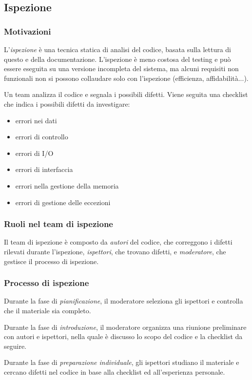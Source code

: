 \documentclass[11pt]{article}
\begin{document}
\subsection{Ispezione}
\subsubsection*{Motivazioni}
L'\textit{ispezione} è una tecnica statica di analisi del codice, basata sulla lettura di questo e della documentazione.
L'ispezione è meno costosa del testing e può essere eseguita su una versione incompleta del sistema, ma alcuni requisiti 
non funzionali non si possono collaudare solo con l'ispezione (efficienza, affidabilità...).

Un team analizza il codice e segnala i possibili difetti. Viene seguita una checklist che indica i possibili difetti da 
investigare: 
\begin{itemize}
    \item errori nei dati 
    \item errori di controllo 
    \item errori di I/O 
    \item errori di interfaccia 
    \item errori nella gestione della memoria 
    \item errori di gestione delle eccezioni 
\end{itemize}
\subsubsection*{Ruoli nel team di ispezione}
Il team di ispezione è composto da \textit{autori} del codice, che correggono i difetti rilevati durante l'ispezione, 
\textit{ispettori}, che trovano difetti, e \textit{moderatore}, che gestisce il processo di ispezione.
\subsubsection*{Processo di ispezione}
Durante la fase di \textit{pianificazione}, il moderatore seleziona gli ispettori e controlla che il materiale sia completo.

Durante la fase di \textit{introduzione}, il moderatore organizza una riunione preliminare con autori e ispettori, nella 
quale è discusso lo scopo del codice e la checklist da seguire.

Durante la fase di \textit{preparazione individuale}, gli ispettori studiano il materiale e cercano difetti nel codice 
in base alla checklist ed all'esperienza personale.
\end{document}
